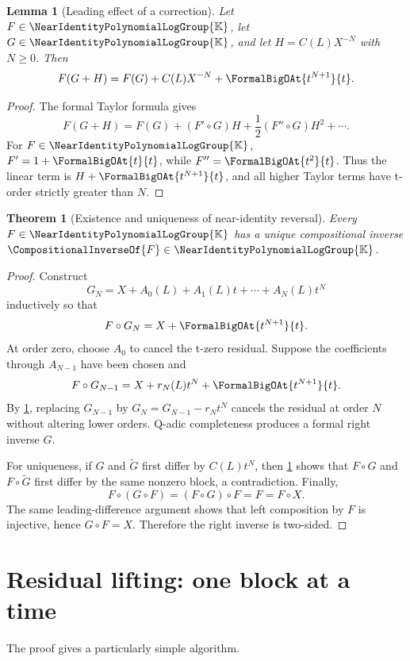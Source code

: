 \documentclass[11pt,openany]{book}
\theoremstyle{definition}
\theoremstyle{plain}
\newtheorem{theorem}{Theorem}[chapter]
\newtheorem{lemma}{Lemma}[chapter]
\theoremstyle{remark}
\newcommand{\K}{\mathbb{K}}
\newcommand{\rev}[1]{\CompositionalInverseOf{#1}}
\newcommand{\compose}{\mathbin{\circ}}
\begin{document}
\begin{lemma}[Leading effect of a correction]\label{lem:leading-correction}
Let \(F\in\NearIdentityPolynomialLogGroup{\K}\), let \(G\in\NearIdentityPolynomialLogGroup{\K}\), and let
\(H=C(L)X^{-N}\) with \(N\ge0\).  Then
\begin{equation}\label{eq:leading-correction}
 F(G+H)=F(G)+C(L)X^{-N}+\FormalBigOAt{t^{N+1}}{t}.
\end{equation}
\end{lemma}
\begin{proof}
The formal Taylor formula gives
\[
 F(G+H)=F(G)+(F'\compose G)H+\frac12(F''\compose G)H^2+\cdots.
\]
For \(F\in\NearIdentityPolynomialLogGroup{\K}\), \(F'=1+\FormalBigOAt{t}{t}\), while \(F''=\FormalBigOAt{t^2}{t}\).  Thus the
linear term is \(H+\FormalBigOAt{t^{N+1}}{t}\), and all higher Taylor terms have t-order
strictly greater than \(N\).
\end{proof}

\begin{theorem}[Existence and uniqueness of near-identity reversal]\label{thm:reversion-exists}
Every \(F\in\NearIdentityPolynomialLogGroup{\K}\) has a unique compositional inverse
\(\rev{F}\in\NearIdentityPolynomialLogGroup{\K}\).
\end{theorem}
\begin{proof}
Construct
\[
 G_N=X+A_0(L)+A_1(L)t+\cdots+A_N(L)t^N
\]
inductively so that
\[
 F\compose G_N=X+\FormalBigOAt{t^{N+1}}{t}.
\]
At order zero, choose \(A_0\) to cancel the t-zero residual.  Suppose the
coefficients through \(A_{N-1}\) have been chosen and
\[
 F\compose G_{N-1}=X+r_N(L)t^N+\FormalBigOAt{t^{N+1}}{t}.
\]
By \cref{lem:leading-correction}, replacing \(G_{N-1}\) by
\(G_N=G_{N-1}-r_Nt^N\) cancels the residual at order \(N\) without altering
lower orders.  Q-adic completeness produces a formal right inverse \(G\).

For uniqueness, if \(G\) and \(\widetilde G\) first differ by
\(C(L)t^N\), then \cref{lem:leading-correction} shows that
\(F\compose G\) and \(F\compose\widetilde G\) first differ by the same nonzero
block, a contradiction.  Finally,
\[
 F\compose(G\compose F)=(F\compose G)\compose F=F=F\compose X.
\]
The same leading-difference argument shows that left composition by \(F\) is
injective, hence \(G\compose F=X\).  Therefore the right inverse is two-sided.
\end{proof}

\section{Residual lifting: one block at a time}
The proof gives a particularly simple algorithm.
\end{document}
